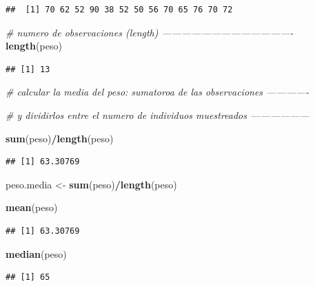 \documentclass[
]{article}
\newenvironment{Shaded}{\begin{snugshade}}{\end{snugshade}}
\newcommand{\CommentTok}[1]{\textcolor[rgb]{0.56,0.35,0.01}{\textit{#1}}}
\newcommand{\KeywordTok}[1]{\textcolor[rgb]{0.13,0.29,0.53}{\textbf{#1}}}
\newcommand{\NormalTok}[1]{#1}
\newcommand{\OperatorTok}[1]{\textcolor[rgb]{0.81,0.36,0.00}{\textbf{#1}}}
\newcommand{\StringTok}[1]{\textcolor[rgb]{0.31,0.60,0.02}{#1}}
\begin{document}
\begin{verbatim}
##  [1] 70 62 52 90 38 52 50 56 70 65 76 70 72
\end{verbatim}

\begin{Shaded}
\begin{Highlighting}[]
\CommentTok{# numero de observaciones (length) ----------------------------------------}
 \KeywordTok{length}\NormalTok{(peso) }
\end{Highlighting}
\end{Shaded}

\begin{verbatim}
## [1] 13
\end{verbatim}

\begin{Shaded}
\begin{Highlighting}[]
\CommentTok{# calcular la media del peso: sumatoroa de las observaciones  -------------}

\CommentTok{# y dividirlos entre el numero de individuos muestreados ------------------}

\KeywordTok{sum}\NormalTok{(peso)}\OperatorTok{/}\KeywordTok{length}\NormalTok{(peso) }
\end{Highlighting}
\end{Shaded}

\begin{verbatim}
## [1] 63.30769
\end{verbatim}

\begin{Shaded}
\begin{Highlighting}[]
\NormalTok{peso.media <-}\StringTok{ }\KeywordTok{sum}\NormalTok{(peso)}\OperatorTok{/}\KeywordTok{length}\NormalTok{(peso)}

\KeywordTok{mean}\NormalTok{(peso)}
\end{Highlighting}
\end{Shaded}

\begin{verbatim}
## [1] 63.30769
\end{verbatim}

\begin{Shaded}
\begin{Highlighting}[]
\KeywordTok{median}\NormalTok{(peso)}
\end{Highlighting}
\end{Shaded}

\begin{verbatim}
## [1] 65
\end{verbatim}
\end{document}
